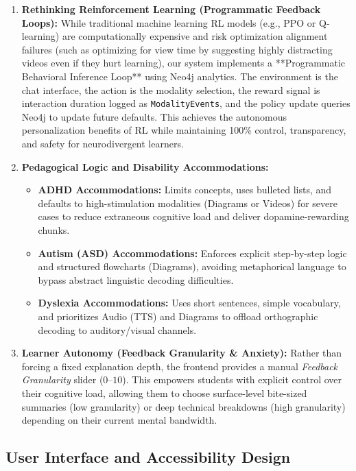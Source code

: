 \begin{enumerate}
    \item \textbf{Rethinking Reinforcement Learning (Programmatic Feedback Loops):} While traditional machine learning RL models (e.g., PPO or Q-learning) are computationally expensive and risk optimization alignment failures (such as optimizing for view time by suggesting highly distracting videos even if they hurt learning), our system implements a **Programmatic Behavioral Inference Loop** using Neo4j analytics. The environment is the chat interface, the action is the modality selection, the reward signal is interaction duration logged as \texttt{ModalityEvents}, and the policy update queries Neo4j to update future defaults. This achieves the autonomous personalization benefits of RL while maintaining 100\% control, transparency, and safety for neurodivergent learners.

    \item \textbf{Pedagogical Logic and Disability Accommodations:}
    \begin{itemize}
        \item \textbf{ADHD Accommodations:} Limits concepts, uses bulleted lists, and defaults to high-stimulation modalities (Diagrams or Videos) for severe cases to reduce extraneous cognitive load and deliver dopamine-rewarding chunks.
        \item \textbf{Autism (ASD) Accommodations:} Enforces explicit step-by-step logic and structured flowcharts (Diagrams), avoiding metaphorical language to bypass abstract linguistic decoding difficulties.
        \item \textbf{Dyslexia Accommodations:} Uses short sentences, simple vocabulary, and prioritizes Audio (TTS) and Diagrams to offload orthographic decoding to auditory/visual channels.
    \end{itemize}
    
    \item \textbf{Learner Autonomy (Feedback Granularity \& Anxiety):} 
    Rather than forcing a fixed explanation depth, the frontend provides a manual \textit{Feedback Granularity} slider ($0$--$10$). This empowers students with explicit control over their cognitive load, allowing them to choose surface-level bite-sized summaries (low granularity) or deep technical breakdowns (high granularity) depending on their current mental bandwidth.
\end{enumerate}

\subsection{User Interface and Accessibility Design}
\label{subsec:ui_accessibility}

